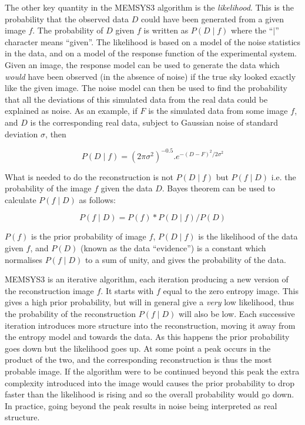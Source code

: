 The other key quantity in the MEMSYS3 algorithm is the {\em likelihood}. This
is  the probability that the observed data $D$ could have been generated from a
given image $f$. The probability of $D$ given $f$  is written as $P( D \mid f
)$ where the ``$\mid$'' character means ``given''. The likelihood is based on a
model of the noise statistics in the data, and on a model of the response
function of the experimental system. Given an image, the response model can be
used to generate the data which {\em would} have been observed (in the absence
of noise) if the true sky looked exactly like the given image. The noise model
can then be used to find the probability that all the deviations of  this
simulated data from the real data could be explained as noise. As an  example,
if $F$ is the simulated data from some image $f$, and $D$ is the  corresponding
real data, subject to Gaussian noise of standard deviation  $\sigma$, then

\begin{equation}
P(D \mid f) = (2\pi\sigma^{2})^{-0.5}.e^{-(D-F)^{2}/2\sigma^{2}}
\end{equation}

What is needed to do the reconstruction is not $P( D \mid f)$ but
$P( f \mid D)$ i.e. the probability of the image $f$ given the data $D$.
Bayes theorem can be used to calculate $P( f \mid D )$ as follows:

\begin{equation}
P(f \mid D) = P(f)*P(D \mid f)/P(D) \label{EQ:BAYES}
\end{equation}

$P(f)$ is the prior probability of image $f$, $P( D \mid f )$ is the likelihood
of  the data given $f$, and $P(D)$ (known as the data ``evidence'') is a
constant  which normalises $P( f \mid D )$ to a sum of unity, and gives the
probability of  the data.

MEMSYS3 is an iterative algorithm, each iteration producing a new version of
the reconstruction image $f$. It starts with $f$ equal to the zero entropy
image.  This gives a high prior probability, but will in general give a {\em
very} low likelihood, thus the probability of the reconstruction $P(f \mid D)$
will  also be low. Each successive iteration introduces more structure into the
reconstruction, moving it away from the entropy model and towards the data. As
this happens the prior probability goes down but the likelihood goes up. At
some  point a peak occurs in the product of the two, and the corresponding
reconstruction is thus the most probable image. If the algorithm were to be
continued beyond this peak the extra complexity introduced into the image would
causes the  prior probability to drop faster than the likelihood is rising and
so the overall  probability would go down. In practice, going beyond the peak
results in noise  being interpreted as real structure.


